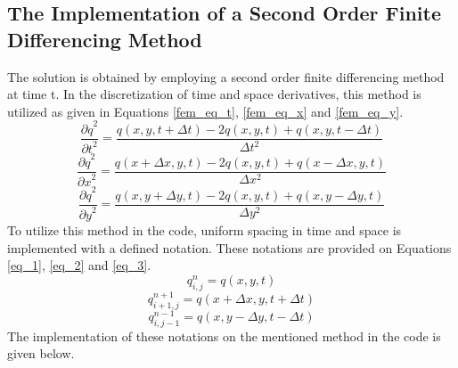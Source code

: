 \documentclass{article}
\begin{document}
\subsection{The Implementation of a Second Order Finite Differencing Method}
The solution is obtained by employing a second order finite differencing method at time t. In the discretization of time and space derivatives, this method is utilized as given in Equations \ref{fem_eq_t}, \ref{fem_eq_x} and \ref{fem_eq_y}. 
\begin{equation}  
    \frac{{\partial q}^2}{{\partial t}^2} = \frac{q(x,y,t + \Delta t) - 2q(x,y,t) + q(x,y,t - \Delta t)}{\Delta t^2}
    \label{fem_eq_t}
\end{equation}
\begin{equation}  
    \frac{{\partial q}^2}{{\partial x}^2} = \frac{q(x + \Delta x,y,t) - 2q(x,y,t) + q(x - \Delta x,y,t)}{\Delta x^2}
    \label{fem_eq_x}
\end{equation}
\begin{equation}  
    \frac{{\partial q}^2}{{\partial y}^2} = \frac{q(x,y + \Delta y,t) - 2q(x,y,t) + q(x,y  - \Delta y,t)}{\Delta y^2}
    \label{fem_eq_y}
\end{equation}
To utilize this method in the code, uniform spacing in time and space is implemented with a defined notation. These notations are provided on Equations \ref{eq_1}, \ref{eq_2} and \ref{eq_3}. 
\begin{equation}  
    q_{i,j}^n = q(x,y,t)
    \label{eq_1}
\end{equation}
\begin{equation}  
    q_{i+1,j}^{n+1} = q(x + \Delta x,y,t + \Delta t)
    \label{eq_2}
\end{equation}
\begin{equation}  
    q_{i,j-1}^{n-1} = q(x,y - \Delta y,t - \Delta t)
    \label{eq_3}
\end{equation}
The implementation of these notations on the mentioned method in the code is given below. 
\end{document}
